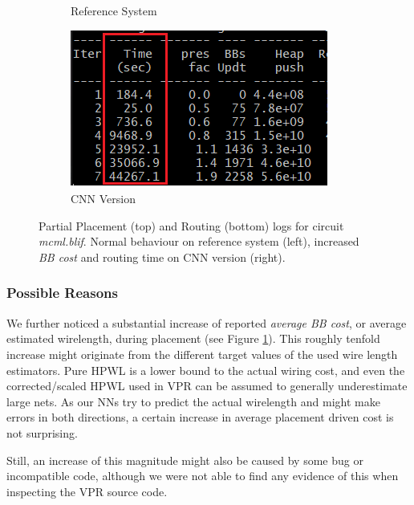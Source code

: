 \begin{figure}
\begin{subfigure}[b]{0.49\linewidth}
		\caption{Reference System}
	\end{subfigure}
	\hfill
	\begin{subfigure}[b]{0.49\linewidth}
		\includegraphics[width=\linewidth]{plots/log_route_cnn.png}
		\caption{\gls{CNN} Version}
	\end{subfigure}
	\caption{Partial Placement (top) and Routing (bottom) logs for circuit \textit{mcml.blif}. Normal behaviour on reference system (left), increased \textit{\gls{BB} cost} and routing time on \gls{CNN} version (right).}
	\label{fig:eval-problem-logs}
\end{figure}

\pagebreak

\subsubsection{Possible Reasons}

We further noticed a substantial increase of reported \textit{average \gls{BB} cost}, or average estimated wirelength, during placement (see Figure \ref{fig:eval-problem-logs}). This roughly tenfold increase might originate from the different target values of the used wire length estimators. Pure \gls{HPWL} is a lower bound to the actual wiring cost, and even the corrected/scaled \gls{HPWL} used in \gls{VPR} can be assumed to generally underestimate large nets. As our \glspl{NN} try to predict the actual wirelength and might make errors in both directions, a certain increase in average placement driven cost is not surprising.

Still, an increase of this magnitude might also be caused by some bug or incompatible code, although we were not able to find any evidence of this when inspecting the \gls{VPR} source code.

